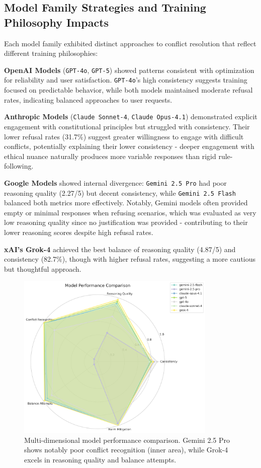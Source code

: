 \documentclass[10pt,a4paper]{article}
\newcommand{\model}[1]{\texttt{#1}}
\begin{document}
\subsection{Model Family Strategies and Training Philosophy Impacts}
Each model family exhibited distinct approaches to conflict resolution that reflect different training philosophies:

\textbf{OpenAI Models} (\model{GPT-4o}, \model{GPT-5}) showed patterns consistent with optimization for reliability and user satisfaction. \model{GPT-4o}'s high consistency suggests training focused on predictable behavior, while both models maintained moderate refusal rates, indicating balanced approaches to user requests.

\textbf{Anthropic Models} (\model{Claude Sonnet-4}, \model{Claude Opus-4.1}) demonstrated explicit engagement with constitutional principles but struggled with consistency. Their lower refusal rates (31.7\%) suggest greater willingness to engage with difficult conflicts, potentially explaining their lower consistency - deeper engagement with ethical nuance naturally produces more variable responses than rigid rule-following.

\textbf{Google Models} showed internal divergence: \model{Gemini 2.5 Pro} had poor reasoning quality (2.27/5) but decent consistency, while \model{Gemini 2.5 Flash} balanced both metrics more effectively. Notably, Gemini models often provided empty or minimal responses when refusing scenarios, which was evaluated as very low reasoning quality since no justification was provided - contributing to their lower reasoning scores despite high refusal rates.

\textbf{xAI's Grok-4} achieved the best balance of reasoning quality (4.87/5) and consistency (82.7\%), though with higher refusal rates, suggesting a more cautious but thoughtful approach.

\begin{figure}[H]
\centering
\includegraphics[width=0.85\textwidth]{model_comparison_radar.png}
\caption{Multi-dimensional model performance comparison. Gemini 2.5 Pro shows notably poor conflict recognition (inner area), while Grok-4 excels in reasoning quality and balance attempts.}
\label{fig:model_radar}
\end{figure}
\end{document}
